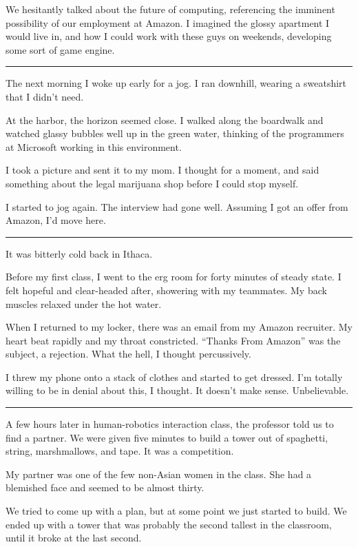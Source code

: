 We hesitantly talked about the future of computing, referencing the imminent
possibility of our employment at Amazon.  I imagined the glossy apartment I
would live in, and how I could work with these guys on weekends, developing some
sort of game engine.

\plainfancybreak{12pt}{2}{}

The next morning I woke up early for a jog.  I ran downhill, wearing a
sweatshirt that I didn't need.

At the harbor, the horizon seemed close.  I walked along the boardwalk and
watched glassy bubbles well up in the green water, thinking of the programmers
at Microsoft working in this environment.

I took a picture and sent it to my mom.  I thought for a moment, and said
something about the legal marijuana shop before I could stop myself.

I started to jog again.  The interview had gone well.  Assuming I got an offer
from Amazon, I'd move here. 

\plainfancybreak{12pt}{2}{}

It was bitterly cold back in Ithaca.

Before my first class, I went to the erg room for forty minutes of steady state.
I felt hopeful and clear-headed after, showering with my teammates.  My back
muscles relaxed under the hot water.

When I returned to my locker, there was an email from my Amazon recruiter.  My
heart beat rapidly and my throat constricted.  ``Thanks From Amazon'' was the
subject, a rejection.  What the hell, I thought percussively. 

I threw my phone onto a stack of clothes and started to get dressed.  I'm
totally willing to be in denial about this, I thought.  It doesn't make sense.
Unbelievable. 

\plainfancybreak{12pt}{2}{}

A few hours later in human-robotics interaction class, the professor told us to find a
partner.  We were given five minutes to build a tower out of spaghetti, string,
marshmallows, and tape.  It was a competition.

My partner was one of the few non-Asian women in the class.  She had a blemished
face and seemed to be almost thirty. 

We tried to come up with a plan, but at some point we just started to build. We
ended up with a tower that was probably the second tallest in the classroom,
until it broke at the last second.

